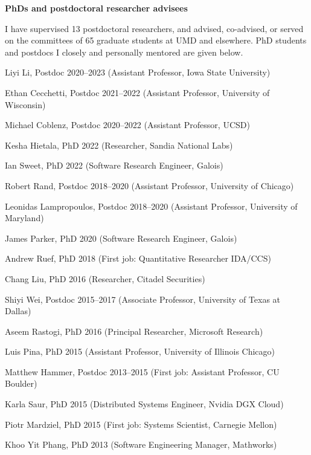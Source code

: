 \documentclass[11pt]{article}
\begin{document}
\begin{description}
\setlength{\labelsep}{0ex}
\setlength{\itemsep}{-0.5ex}

\item {\bf\textsf PhDs and postdoctoral researcher advisees} 
\item I have supervised 13 postdoctoral researchers, and
  advised, co-advised, or served on the committees of 65 graduate
  students at UMD and elsewhere. PhD students and postdocs I
  closely and personally mentored are given below.
\item
  
\item Liyi Li, Postdoc 2020--2023 (Assistant Professor, Iowa State University)
\item Ethan Cecchetti, Postdoc 2021--2022 (Assistant Professor, University of Wisconsin)
\item Michael Coblenz, Postdoc 2020--2022 (Assistant Professor, UCSD)
\item Kesha Hietala, PhD 2022 (Researcher, Sandia National Labs)
\item Ian Sweet, PhD 2022 (Software Research Engineer, Galois)
\item Robert Rand, Postdoc 2018--2020 (Assistant Professor, University
  of Chicago)
\item Leonidas Lampropoulos, Postdoc 2018--2020 (Assistant Professor,
  University of Maryland)  
\item James Parker, PhD 2020 (Software Research Engineer, Galois)
\item Andrew Ruef, PhD 2018 (First job: Quantitative Researcher IDA/CCS)
\item Chang Liu, PhD 2016 (Researcher, Citadel Securities)
\item Shiyi Wei, Postdoc 2015--2017 (Associate Professor, University
  of Texas at Dallas)
\item Aseem Rastogi, PhD 2016 (Principal Researcher, Microsoft Research)
\item Luis Pina, PhD 2015 (Assistant Professor, University of Illinois
  Chicago)
\item Matthew Hammer, Postdoc 2013--2015 (First job: Assistant Professor, CU Boulder)
\item Karla Saur, PhD 2015 (Distributed Systems Engineer, Nvidia DGX Cloud)
\item Piotr Mardziel, PhD 2015 (First job: Systems Scientist, Carnegie Mellon)
\item Khoo Yit Phang, PhD 2013 (Software Engineering Manager, Mathworks)

\end{description}
\end{document}

